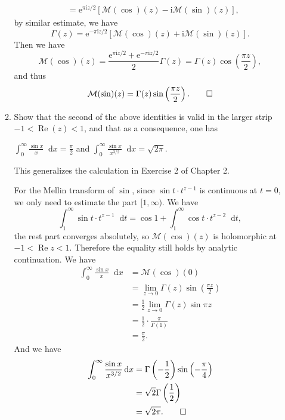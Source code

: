 \documentclass[11pt]{report}
\theoremstyle{mythm}
\let\oldendproof\endproof
\renewenvironment{proof}[1][\proofname]{%
  \oldproof[\normalfont \bfseries #1]%
}{\oldendproof}
\renewcommand*{\proofname}{Proof}
\theoremstyle{myans}
\newcommand{\mi}{\mathrm{i}}
\newcommand{\me}{\mathrm{e}}
\newcommand{\dd}{\mathop{}\!\mathrm{d}}
\renewcommand{\Re}{\operatorname{Re}}
\begin{document}
\begin{enumerate}
\begin{enumerate}
\begin{proof}
\begin{align*}
        &= \me^{\pi \mi z / 2} [\mathcal{M}(\cos)(z) - \mi \mathcal M(\sin)(z)],
      \end{align*}
      by similar estimate, we have
      \[ \Gamma(z) = \me^{-\pi \mi z / 2} [\mathcal{M}(\cos)(z) + \mi \mathcal M(\sin)(z)]. \]
      Then we have
      \[ \mathcal{M}(\cos)(z) = \frac{\me^{\pi \mi z / 2} + \me^{-\pi \mi z/2}}{2} \Gamma(z)
      = \Gamma(z) \cos\left(\frac{\pi z}{2} \right), \]
      and thus
      \[ \mathcal{M}(\sin)(z) = \Gamma(z) \sin\left(\frac{\pi z}{2} \right). \qedhere \]
    \end{proof}
    \item Show that the second of the above identities is valid in the larger strip
    $-1 < \Re(z) < 1$, and that as a consequence, one has
    \begin{center}
      $\displaystyle \int_0^\infty \frac{\sin x}{x} \dd x = \frac{\pi}{2}$
      \quad and \quad 
      $\displaystyle \int_0^\infty \frac{\sin x}{x^{3/2}} \dd x = \sqrt{2\pi}$.
    \end{center}
    This generalizes the calculation in Exercise 2 of Chapter 2.
    \begin{proof}
      For the Mellin transform of $\sin$, since $\sin t \cdot t^{z-1}$ is continuous at $t=0$,
      we only need to estimate the part $[1, \infty)$. We have
      \[ \int_1^\infty \sin t \cdot t^{z-1}\dd t = \cos 1 + \int_1^\infty \cos t \cdot t^{z-2}\dd t, \]
      the rest part converges absolutely, so $\mathcal M(\cos)(z)$ is holomorphic at
      $-1 < \Re z < 1$. Therefore the equality still holds by analytic continuation. We have
      \begin{align*}
        \int_0^\infty \frac{\sin x}{x} \dd x &= \mathcal M(\cos)(0) \\
        &= \lim_{z\to 0} \Gamma(z)\sin\left(\frac{\pi z}2\right)\\
        &= \frac 1 2 \lim_{z\to 0} \Gamma(z)\sin \pi z\\
        &= \frac 12 \cdot \frac {\pi}{\Gamma(1)}\\
        &= \frac \pi 2.
      \end{align*}
      And we have
      \begin{align*}
        \int_0^\infty \frac{\sin x}{x^{3/2}}\dd x &= \Gamma\left(-\frac 1 2\right) \sin\left(- \frac{\pi} 4\right)\\
         &= \sqrt 2\Gamma\left(\frac 1 2\right)\\
         &= \sqrt{2\pi}. \qedhere
      \end{align*}

\end{proof}
\end{enumerate}
\end{enumerate}
\end{document}
